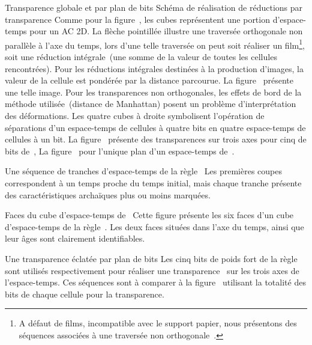 %
{Transparence globale et par plan de bits}%
{Sch\'ema de r\'ealisation de r\'eductions par transparence}%
{Comme pour la figure~, les cubes repr\'esentent une
  portion d'espace-temps pour un AC 2D. %
  La fl\`eche pointill\'ee illustre une travers\'ee orthogonale non parall\`ele
  \`a l'axe du temps, lors d'une telle travers\'ee on peut soit r\'ealiser un
  film\footnote{%
    A d\'efaut de films, incompatible avec le support papier, nous
    pr\'esentons des s\'equences associ\'ees \`a une travers\'ee non
    orthogonale~.}, %
  soit une r\'eduction int\'egrale~(une somme de la valeur de toutes
  les cellules rencontr\'ees). %
  Pour les r\'eductions int\'egrales destin\'ees \`a la production d'images,
  la valeur de la cellule est pond\'er\'ee par la distance parcourue. %
  La figure~ pr\'esente une telle
  image. %
  Pour les transparences non orthogonales, les effets de bord de la
  m\'ethode utilis\'ee~(distance de Manhattan) posent un probl\`eme
  d'interpr\'etation des d\'eformations. %
  Les quatre cubes \`a droite symbolisent l'op\'eration de s\'eparations d'un
  espace-temps de cellules \`a quatre bits en quatre espace-temps de
  cellules \`a un bit. %
  La figure~ pr\'esente des
  transparences sur trois axes pour cinq  de bits
  de~, %
  La figure~ pour l'unique plan d'un
  espace-temps de~.}

%
{}%
{Une s\'equence de tranches d'espace-temps de la r\`egle~}%
{Les premi\`eres coupes correspondent \`a un temps proche du temps initial,
  mais chaque tranche pr\'esente des caract\'eristiques archa\"iques plus ou
  moins marqu\'ees.}

%
{}%
{Faces du cube d'espace-temps de~}%
{Cette figure pr\'esente les six faces d'un cube d'espace-temps de la
  r\`egle~. %
  Les deux faces situ\'ees dans l'axe du temps, ainsi que leur \^ages
  sont clairement identifiables.}

%
{}%
{Une transparence \'eclat\'ee par plan de bits}%
{Les cinq bits de poids fort de la r\`egle~ sont utilis\'es
  respectivement pour r\'ealiser une
  transparence~ sur les trois axes de
  l'espace-temps. %
  Ces s\'equences sont \`a comparer \`a la
  figure~ utilisant la totalit\'e des
  bits de chaque cellule pour la transparence.}

